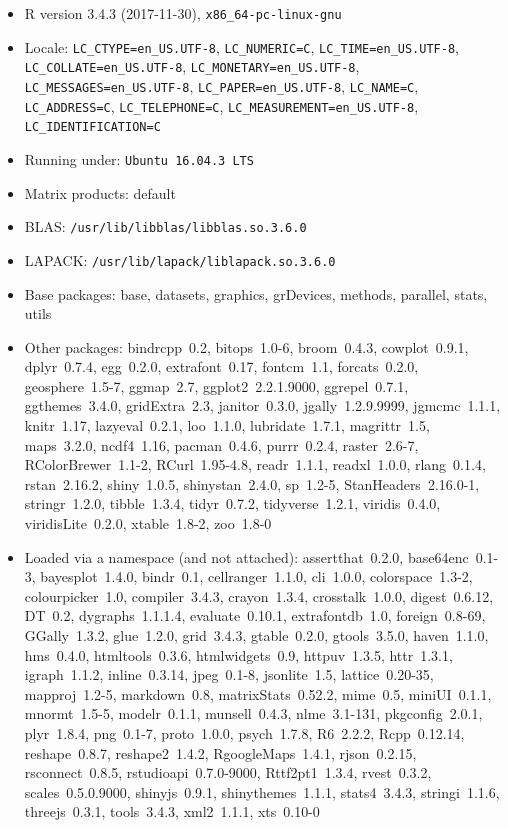 \documentclass[draft]{agujournal}
\begin{document}
\begin{itemize}\raggedright
  \item R version 3.4.3 (2017-11-30), \verb|x86_64-pc-linux-gnu|
  \item Locale: \verb|LC_CTYPE=en_US.UTF-8|, \verb|LC_NUMERIC=C|, \verb|LC_TIME=en_US.UTF-8|, \verb|LC_COLLATE=en_US.UTF-8|, \verb|LC_MONETARY=en_US.UTF-8|, \verb|LC_MESSAGES=en_US.UTF-8|, \verb|LC_PAPER=en_US.UTF-8|, \verb|LC_NAME=C|, \verb|LC_ADDRESS=C|, \verb|LC_TELEPHONE=C|, \verb|LC_MEASUREMENT=en_US.UTF-8|, \verb|LC_IDENTIFICATION=C|
  \item Running under: \verb|Ubuntu 16.04.3 LTS|
  \item Matrix products: default
  \item BLAS: \verb|/usr/lib/libblas/libblas.so.3.6.0|
  \item LAPACK: \verb|/usr/lib/lapack/liblapack.so.3.6.0|
  \item Base packages: base, datasets, graphics, grDevices,
    methods, parallel, stats, utils
  \item Other packages: bindrcpp~0.2, bitops~1.0-6, broom~0.4.3,
    cowplot~0.9.1, dplyr~0.7.4, egg~0.2.0, extrafont~0.17,
    fontcm~1.1, forcats~0.2.0, geosphere~1.5-7, ggmap~2.7,
    ggplot2~2.2.1.9000, ggrepel~0.7.1, ggthemes~3.4.0,
    gridExtra~2.3, janitor~0.3.0, jgally~1.2.9.9999, jgmcmc~1.1.1,
    knitr~1.17, lazyeval~0.2.1, loo~1.1.0, lubridate~1.7.1,
    magrittr~1.5, maps~3.2.0, ncdf4~1.16, pacman~0.4.6,
    purrr~0.2.4, raster~2.6-7, RColorBrewer~1.1-2, RCurl~1.95-4.8,
    readr~1.1.1, readxl~1.0.0, rlang~0.1.4, rstan~2.16.2,
    shiny~1.0.5, shinystan~2.4.0, sp~1.2-5, StanHeaders~2.16.0-1,
    stringr~1.2.0, tibble~1.3.4, tidyr~0.7.2, tidyverse~1.2.1,
    viridis~0.4.0, viridisLite~0.2.0, xtable~1.8-2, zoo~1.8-0
  \item Loaded via a namespace (and not attached):
    assertthat~0.2.0, base64enc~0.1-3, bayesplot~1.4.0, bindr~0.1,
    cellranger~1.1.0, cli~1.0.0, colorspace~1.3-2,
    colourpicker~1.0, compiler~3.4.3, crayon~1.3.4,
    crosstalk~1.0.0, digest~0.6.12, DT~0.2, dygraphs~1.1.1.4,
    evaluate~0.10.1, extrafontdb~1.0, foreign~0.8-69,
    GGally~1.3.2, glue~1.2.0, grid~3.4.3, gtable~0.2.0,
    gtools~3.5.0, haven~1.1.0, hms~0.4.0, htmltools~0.3.6,
    htmlwidgets~0.9, httpuv~1.3.5, httr~1.3.1, igraph~1.1.2,
    inline~0.3.14, jpeg~0.1-8, jsonlite~1.5, lattice~0.20-35,
    mapproj~1.2-5, markdown~0.8, matrixStats~0.52.2, mime~0.5,
    miniUI~0.1.1, mnormt~1.5-5, modelr~0.1.1, munsell~0.4.3,
    nlme~3.1-131, pkgconfig~2.0.1, plyr~1.8.4, png~0.1-7,
    proto~1.0.0, psych~1.7.8, R6~2.2.2, Rcpp~0.12.14,
    reshape~0.8.7, reshape2~1.4.2, RgoogleMaps~1.4.1,
    rjson~0.2.15, rsconnect~0.8.5, rstudioapi~0.7.0-9000,
    Rttf2pt1~1.3.4, rvest~0.3.2, scales~0.5.0.9000, shinyjs~0.9.1,
    shinythemes~1.1.1, stats4~3.4.3, stringi~1.1.6, threejs~0.3.1,
    tools~3.4.3, xml2~1.1.1, xts~0.10-0
\end{itemize}
\end{document}
